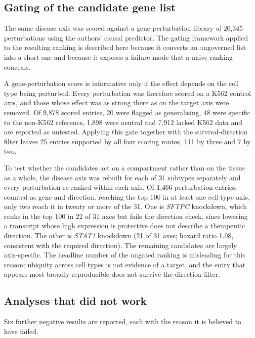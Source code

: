 

\subsection{Gating of the candidate gene list}

The same disease axis was scored against a gene-perturbation library of 20,345 perturbations
\citep{pan2026scmg} using the authors' causal predictor. The gating framework applied to the
resulting ranking is described here because it converts an ungoverned list into a short one
and because it exposes a failure mode that a naive ranking conceals.

A gene-perturbation score is informative only if the effect depends on the cell type being
perturbed. Every perturbation was therefore scored on a K562 control axis, and those whose
effect was as strong there as on the target axis were removed. Of 9,878 scored entries, 20
were flagged as generalising, 48 were specific to the non-K562 reference, 1,898 were neutral
and 7,912 lacked K562 data and are reported as untested. Applying this gate together with
the survival-direction filter leaves 25 entries supported by all four scoring routes, 111 by
three and 7 by two.

To test whether the candidates act on a compartment rather than on the tissue as a whole,
the disease axis was rebuilt for each of 31 subtypes separately and every perturbation
re-ranked within each axis. Of 1,466 perturbation entries, counted as gene and direction,
reaching the top 100 in at least one cell-type axis, only two reach it in twenty or more of
the 31. One is \emph{SFTPC} knockdown, which
ranks in the top 100 in 22 of 31 axes but fails the direction check, since lowering a
transcript whose high expression is protective does not describe a therapeutic direction.
The other is \emph{STAT1} knockdown (21 of 31 axes; hazard ratio 1.08, consistent with the
required direction). The remaining candidates are largely axis-specific. The headline number
of the ungated ranking is misleading for this reason: ubiquity across cell types is not
evidence of a target, and the entry that appears most broadly reproducible does not survive
the direction filter.

\subsection{Analyses that did not work}

Six further negative results are reported, each with the reason it is believed to have
failed.

